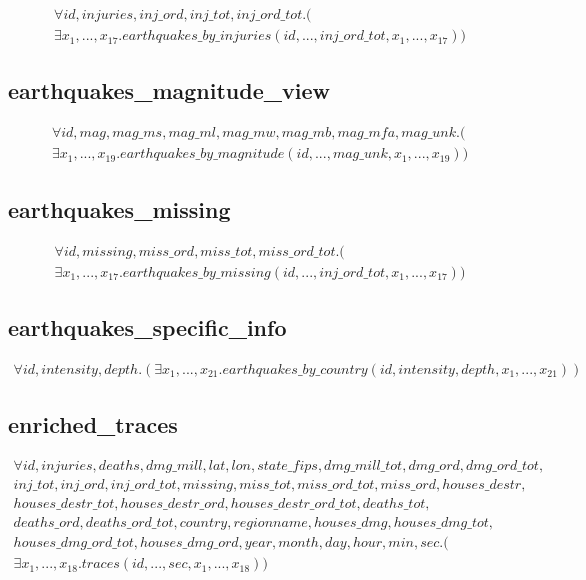 \documentclass{article}
\begin{document}
\begin{multline}
\forall id, injuries, inj\_ord, inj\_tot, inj\_ord\_tot.(\\
\exists x_1, ..., x_{17}. earthquakes\_by\_injuries(id, ..., inj\_ord\_tot, x_1, ..., x_{17}))
\end{multline} 

\subsection{earthquakes\_magnitude\_view}


\begin{multline}
\forall id, mag, mag\_ms, mag\_ml, mag\_mw, mag\_mb, mag\_mfa, mag\_unk.(\\
\exists x_1, ..., x_{19}. earthquakes\_by\_magnitude(id, ..., mag\_unk, x_1, ..., x_{19}))
\end{multline} 

\subsection{earthquakes\_missing}

\begin{multline}
\forall id, missing, miss\_ord, miss\_tot, miss\_ord\_tot.(\\
\exists x_1, ..., x_{17}. earthquakes\_by\_missing(id, ..., inj\_ord\_tot, x_1, ..., x_{17}))
\end{multline} 

\subsection{earthquakes\_specific\_info}

\begin{multline}
\forall id, intensity, depth.(
\exists x_1, ..., x_{21}. earthquakes\_by\_country(id, intensity, depth, x_1, ..., x_{21}))
\end{multline} 


\subsection{enriched\_traces}

\begin{multline}
\forall id, injuries, deaths, dmg\_mill, lat, lon, state\_fips, dmg\_mill\_tot, dmg\_ord, dmg\_ord\_tot, \\ inj\_tot, inj\_ord, inj\_ord\_tot, missing, miss\_tot, miss\_ord\_tot, miss\_ord, houses\_destr, \\ houses\_destr\_tot, houses\_destr\_ord, houses\_destr\_ord\_tot, deaths\_tot, \\ deaths\_ord, deaths\_ord\_tot, country, regionname, houses\_dmg, houses\_dmg\_tot,\\ houses\_dmg\_ord\_tot, houses\_dmg\_ord, year, month, day, hour, min, sec.(\\
\exists x_1, ..., x_{18}. traces(id, ..., sec, x_1, ..., x_{18}))
\end{multline} 
\end{document}
